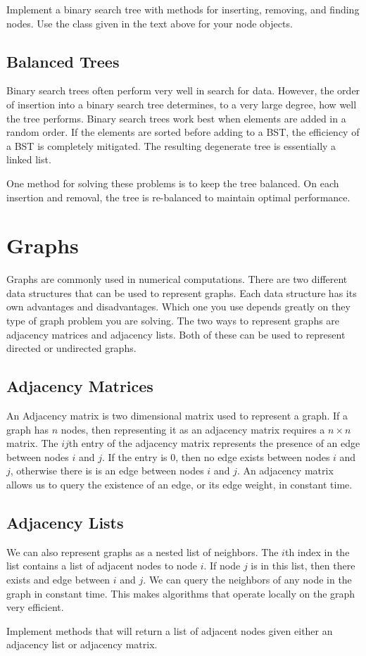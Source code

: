 \begin{problem}
Implement a binary search tree with methods for inserting, removing, and finding nodes.
Use the  class given in the text above for your node objects.
\end{problem}

\subsection*{Balanced Trees}
Binary search trees often perform very well in search for data.
However, the order of insertion into a binary search tree determines, to a very large degree, how well the tree performs.
Binary search trees work best when elements are added in a random order.
If the elements are sorted before adding to a BST, the efficiency of a BST is completely mitigated.  
The resulting degenerate tree is essentially a linked list.
 

One method for solving these problems is to keep the tree balanced.
On each insertion and removal, the tree is re-balanced to maintain optimal performance.


\section*{Graphs}
Graphs are commonly used in numerical computations.
There are two different data structures that can be used to represent graphs.
Each data structure has its own advantages and disadvantages.
Which one you use depends greatly on they type of graph problem you are solving.
The two ways to represent graphs are adjacency matrices and adjacency lists.
Both of these can be used to represent directed or undirected graphs.

\subsection*{Adjacency Matrices}
An Adjacency matrix is two dimensional matrix used to represent a graph.
If a graph has $n$ nodes, then representing it as an adjacency matrix requires a $n \times n$ matrix.
The $ij$th entry of the adjacency matrix represents the presence of an edge between nodes $i$ and $j$.
If the entry is 0, then no edge exists between nodes $i$ and $j$, otherwise there is is an edge between nodes $i$ and $j$.
An adjacency matrix allows us to query the existence of an edge, or its edge weight, in constant time.

\subsection*{Adjacency Lists}
We can also represent graphs as a nested list of neighbors.
The $i$th index in the list contains a list of adjacent nodes to node $i$.  
If node $j$ is in this list, then there exists and edge between $i$ and $j$.
We can query the neighbors of any node in the graph in constant time.
This makes algorithms that operate locally on the graph very efficient. 

\begin{problem}
Implement methods that will return a list of adjacent nodes given either an adjacency list or adjacency matrix.
\end{problem}


